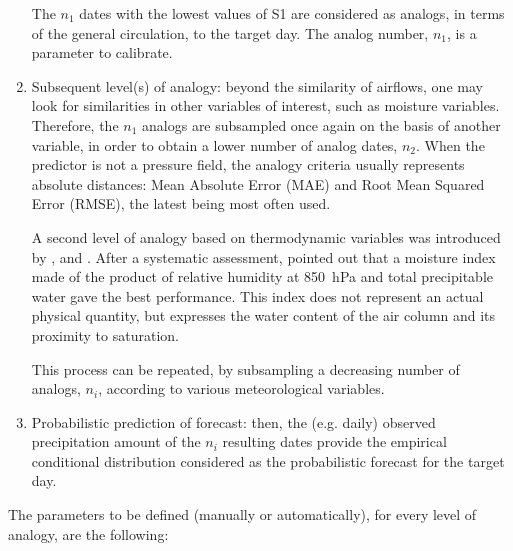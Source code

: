 \documentclass{ametsoc}
\begin{document}
\begin{enumerate}
	The $n_{1}$ dates with the lowest values of S1 are considered as analogs, in terms of the general circulation, to the target day. The analog number, $n_{1}$, is a parameter to calibrate.
	
	\item Subsequent level(s) of analogy: beyond the similarity of airflows, one may look for similarities in other variables of interest, such as moisture variables. Therefore, the $n_{1}$ analogs are subsampled once again on the basis of another variable, in order to obtain a lower number of analog dates, $n_{2}$. When the predictor is not a pressure field, the analogy criteria usually represents absolute distances: Mean Absolute Error (MAE) and Root Mean Squared Error (RMSE), the latest being most often used.
	
	A second level of analogy based on thermodynamic variables was introduced by \citet{Vallee1986}, and \citet{Gibergans-Baguena2007}. After a systematic assessment, \citet{Bontron2004} pointed out that a moisture index made of the product of relative humidity at 850~hPa and total precipitable water gave the best performance. This index does not represent an actual physical quantity, but expresses the water content of the air column and its proximity to saturation.
	
	This process can be repeated, by subsampling a decreasing number of analogs, $n_{i}$, according to various meteorological variables.
	
	\item Probabilistic prediction of forecast: then, the (e.g. daily) observed precipitation amount of the $n_{i}$ resulting dates provide the empirical conditional distribution considered as the probabilistic forecast for the target day.
	
\end{enumerate}

The parameters to be defined (manually or automatically), for every level of analogy, are the following:
\end{document}
